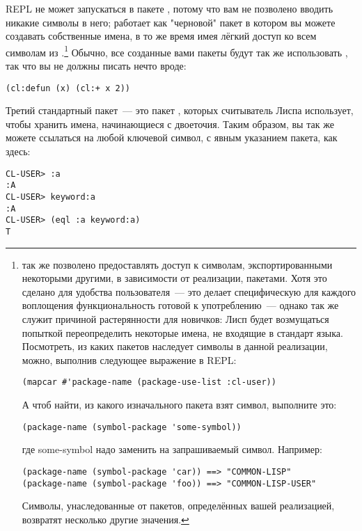 REPL не может запускаться в пакете , потому что вам не позволено вводить
никакие символы в него;  работает как "черновой" пакет в котором вы
можете создавать собственные имена, в то же время имея лёгкий доступ ко всем символам из
.\footnote{ так же позволено предоставлять доступ
  к символам, экспортированными некоторыми другими, в зависимости от реализации,
  пакетами. Хотя это сделано для удобства пользователя~--- это делает специфическую для
  каждого воплощения функциональность готовой к употреблению~--- однако так же служит
  причиной растерянности для новичков: Лисп будет возмущаться попыткой переопределить
  некоторые имена, не входящие в стандарт языка. Посмотреть, из каких пакетов
   наследует символы в данной реализации, можно, выполнив следующее
  выражение в REPL:

\begin{lstlisting}
(mapcar #'package-name (package-use-list :cl-user))
\end{lstlisting}

А чтоб найти, из какого изначального пакета взят символ, выполните это:

\begin{lstlisting}
(package-name (symbol-package 'some-symbol))
\end{lstlisting}

где some-symbol надо заменить на запрашиваемый символ. Например:

\begin{lstlisting}
(package-name (symbol-package 'car)) ==> "COMMON-LISP"
(package-name (symbol-package 'foo)) ==> "COMMON-LISP-USER"
\end{lstlisting}

Символы, унаследованные от пакетов, определённых вашей реализацией, возвратят несколько
другие значения.} Обычно, все созданные вами пакеты будут так же использовать
, так что вы не должны писать нечто вроде:

\begin{lstlisting}
(cl:defun (x) (cl:+ x 2))
\end{lstlisting}

Третий стандартный пакет~--- это пакет , которых считыватель Лиспа
использует, чтобы хранить имена, начинающиеся с двоеточия. Таким образом, вы так же можете
ссылаться на любой ключевой символ, с явным указанием пакета, как здесь:

\begin{lstlisting}
CL-USER> :a
:A
CL-USER> keyword:a
:A
CL-USER> (eql :a keyword:a)
T
\end{lstlisting}

